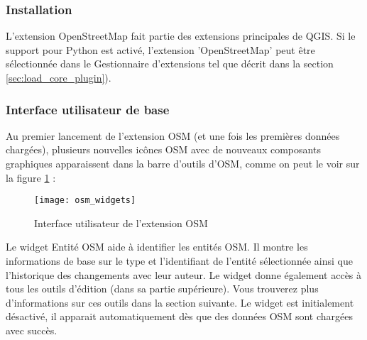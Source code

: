\subsubsection{Installation}

L'extension OpenStreetMap fait partie des extensions principales de QGIS. Si le support pour Python est activé, l'extension 'OpenStreetMap' peut être sélectionnée dans le Gestionnaire d'extensions tel que décrit dans la section \ref{sec:load_core_plugin}).

\subsubsection{Interface utilisateur de base}

Au premier lancement de l'extension OSM (et une fois les premières données chargées), plusieurs nouvelles icônes OSM avec de nouveaux composants graphiques apparaissent dans la barre d'outils d'OSM, comme on peut le voir sur la figure \ref{fig:osmwidget} :

\begin{figure}[ht]
   \begin{center}
   \caption{Interface utilisateur de l'extension OSM \nixcaption}\label{fig:osmwidget}\smallskip
   \texttt{[image: osm\_widgets]}
\end{center}
\end{figure}


Le widget Entité OSM aide à identifier les entités OSM. Il montre les informations de base sur le type et l'identifiant de l'entité sélectionnée ainsi que l'historique des changements avec leur auteur. Le widget donne également accès à tous les outils d'édition (dans sa partie supérieure). Vous trouverez plus d'informations sur ces outils dans la section suivante. Le widget est initialement désactivé, il apparait automatiquement dès que des données OSM sont chargées avec succès.

